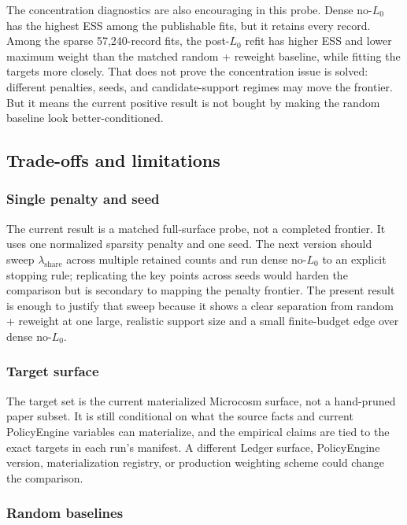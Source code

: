 The concentration diagnostics are also encouraging in this probe. Dense no-$L_0$ has the highest ESS among
the publishable fits, but it retains every record. Among the sparse 57{,}240-record fits, the post-$L_0$
refit has higher ESS and lower maximum weight than the matched random + reweight baseline, while fitting
the targets more closely. That does not prove the concentration issue is solved: different penalties,
seeds, and candidate-support regimes may move the frontier. But it means the current positive result is
not bought by making the random baseline look better-conditioned.

\subsection{Trade-offs and limitations}

\subsubsection{Single penalty and seed}

The current result is a matched full-surface probe, not a completed frontier. It uses one normalized
sparsity penalty and one seed. The next version should sweep $\lambda_{\mathrm{share}}$ across multiple
retained counts and run dense no-$L_0$ to an explicit stopping rule; replicating the key points across
seeds would harden the comparison but is secondary to mapping the penalty frontier. The present result is
enough to justify that sweep because it shows
a clear separation from random + reweight at one large, realistic support size and a small finite-budget
edge over dense no-$L_0$.

\subsubsection{Target surface}

The target set is the current materialized Microcosm surface, not a hand-pruned paper subset. It is still
conditional on what the source facts and current PolicyEngine variables can materialize, and the empirical
claims are tied to the exact targets in each run's manifest. A different Ledger surface, PolicyEngine
version, materialization registry, or production weighting scheme could change the comparison.

\subsubsection{Random baselines}

